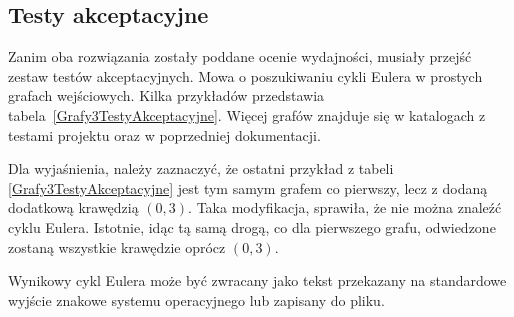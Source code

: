 \subsection{Testy akceptacyjne}
\label{sub:testy_akceptacyjne}

Zanim oba rozwiązania zostały poddane ocenie wydajności, musiały przejść zestaw testów akceptacyjnych.
Mowa o poszukiwaniu cykli Eulera w prostych grafach wejściowych.
Kilka przykładów przedstawia tabela~\ref{Grafy3TestyAkceptacyjne}.
Więcej grafów znajduje się w katalogach z testami projektu oraz w poprzedniej dokumentacji.

Dla wyjaśnienia, należy zaznaczyć, że ostatni przykład z tabeli \ref{Grafy3TestyAkceptacyjne}
jest tym samym grafem co pierwszy, lecz z dodaną dodatkową krawędzią $(0,3)$.
Taka modyfikacja, sprawiła, że nie można znaleźć cyklu Eulera. 
Istotnie, idąc tą samą drogą, co dla pierwszego grafu, odwiedzone zostaną wszystkie krawędzie oprócz $(0,3)$.

Wynikowy cykl Eulera może być zwracany jako tekst przekazany na standardowe wyjście znakowe systemu operacyjnego lub zapisany do pliku.

